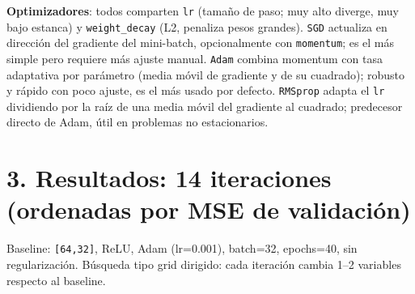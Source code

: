 \documentclass[9pt]{extarticle}
\begin{document}
\textbf{Optimizadores}: todos comparten \texttt{lr} (tamaño de paso; muy alto diverge, muy bajo estanca) y \texttt{weight\_decay} (L2, penaliza pesos grandes). \texttt{SGD} actualiza en dirección del gradiente del mini-batch, opcionalmente con \texttt{momentum}; es el más simple pero requiere más ajuste manual. \texttt{Adam} combina momentum con tasa adaptativa por parámetro (media móvil de gradiente y de su cuadrado); robusto y rápido con poco ajuste, es el más usado por defecto. \texttt{RMSprop} adapta el \texttt{lr} dividiendo por la raíz de una media móvil del gradiente al cuadrado; predecesor directo de Adam, útil en problemas no estacionarios.

\section*{3. Resultados: 14 iteraciones (ordenadas por MSE de validación)}
Baseline: \texttt{[64,32]}, ReLU, Adam (lr=0.001), batch=32, epochs=40, sin regularización. Búsqueda tipo grid dirigido: cada iteración cambia 1--2 variables respecto al baseline.
\end{document}
